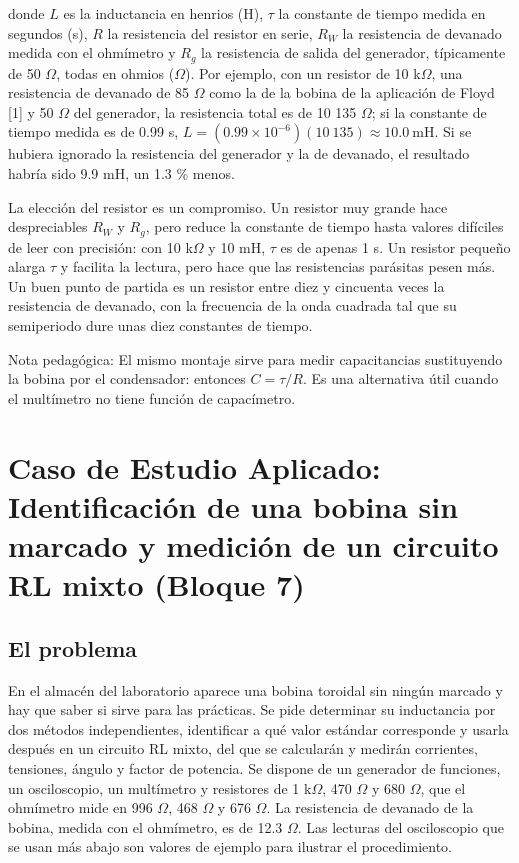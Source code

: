 \documentclass[11pt,letterpaper]{article}
\begin{document}
donde $L$ es la inductancia en henrios (H), $\tau$ la constante de tiempo medida en segundos (s), $R$ la resistencia del resistor en serie, $R_W$ la resistencia de devanado medida con el ohmímetro y $R_g$ la resistencia de salida del generador, típicamente de 50 \ensuremath{\Omega}, todas en ohmios (\ensuremath{\Omega}). Por ejemplo, con un resistor de 10 k\ensuremath{\Omega}, una resistencia de devanado de 85 \ensuremath{\Omega} como la de la bobina de la aplicación de Floyd [1] y 50 \ensuremath{\Omega} del generador, la resistencia total es de 10 135 \ensuremath{\Omega}; si la constante de tiempo medida es de 0.99 \textmu{}s, $L = (0.99 \times 10^{-6})(10\ 135) \approx 10.0\ \text{mH}$. Si se hubiera ignorado la resistencia del generador y la de devanado, el resultado habría sido 9.9 mH, un 1.3 \% menos.

La elección del resistor es un compromiso. Un resistor muy grande hace despreciables $R_W$ y $R_g$, pero reduce la constante de tiempo hasta valores difíciles de leer con precisión: con 10 k\ensuremath{\Omega} y 10 mH, $\tau$ es de apenas 1 \textmu{}s. Un resistor pequeño alarga $\tau$ y facilita la lectura, pero hace que las resistencias parásitas pesen más. Un buen punto de partida es un resistor entre diez y cincuenta veces la resistencia de devanado, con la frecuencia de la onda cuadrada tal que su semiperiodo dure unas diez constantes de tiempo.

\begin{nota}{Nota pedagógica:}
El mismo montaje sirve para medir capacitancias sustituyendo la bobina por el condensador: entonces $C = \tau/R$. Es una alternativa útil cuando el multímetro no tiene función de capacímetro.
\end{nota}

\section{Caso de Estudio Aplicado: Identificación de una bobina sin marcado y medición de un circuito RL mixto (Bloque 7)}

\subsection{El problema}

En el almacén del laboratorio aparece una bobina toroidal sin ningún marcado y hay que saber si sirve para las prácticas. Se pide determinar su inductancia por dos métodos independientes, identificar a qué valor estándar corresponde y usarla después en un circuito RL mixto, del que se calcularán y medirán corrientes, tensiones, ángulo y factor de potencia. Se dispone de un generador de funciones, un osciloscopio, un multímetro y resistores de 1 k\ensuremath{\Omega}, 470 \ensuremath{\Omega} y 680 \ensuremath{\Omega}, que el ohmímetro mide en 996 \ensuremath{\Omega}, 468 \ensuremath{\Omega} y 676 \ensuremath{\Omega}. La resistencia de devanado de la bobina, medida con el ohmímetro, es de 12.3 \ensuremath{\Omega}. Las lecturas del osciloscopio que se usan más abajo son valores de ejemplo para ilustrar el procedimiento.
\end{document}
